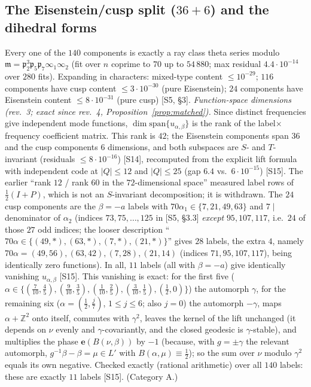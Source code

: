 \documentclass[11pt]{article}
\theoremstyle{definition}
\theoremstyle{plain}
\newcommand{\Z}{\mathbb{Z}}
\newcommand{\e}{\mathbf{e}}
\newcommand{\fp}{\mathfrak{p}}
\newcommand{\fm}{\mathfrak{m}}
\newcommand{\src}[1]{\textup{[S#1]}}
\begin{document}
\subsection{\texorpdfstring{The Eisenstein/cusp split ($36+6$) and the dihedral forms}{The Eisenstein/cusp split (36+6) and the dihedral forms}}
Every one of the $140$ components is exactly a ray class theta series modulo $\fm=\fp_2^3\fp_5\fp_7\infty_1\infty_2$ (fit over $n$ coprime to $70$
up to $54\,880$; max residual $4.4\cdot10^{-14}$ over $280$ fits). Expanding in characters: mixed-type content $\le10^{-29}$; $116$ components have
cusp content $\le3\cdot10^{-30}$ (pure Eisenstein); $24$ components have Eisenstein content $\le8\cdot10^{-31}$ (pure cusp) \src{5, \S3}.
\emph{Function-space dimensions (rev.~3; exact since rev.~4, Proposition~\ref{prop:matched}).} Since distinct frequencies give independent mode functions, $\dim\mathrm{span}\{u_{\alpha,\beta}\}$ is the rank of the
label$\times$frequency coefficient matrix. This rank is $42$; the Eisenstein components span $36$ and the cusp components $6$ dimensions, and both
subspaces are $S$- and $T$-invariant (residuals $\le8\cdot10^{-16}$) \src{14}, recomputed from the explicit lift formula with independent code at
$|Q|\le12$ and $|Q|\le25$ (gap $6.4$ vs.\ $6\cdot10^{-15}$) \src{15}. The earlier ``rank $12$ / rank $60$ in the $72$-dimensional space'' measured label rows of
$\tfrac12(I+P)$, which is not an $S$-invariant decomposition; it is withdrawn.
The $24$ cusp components are the $\beta=-a$ labels with $70\alpha_1\in\{7,21,49,63\}$ and $7\mid$ denominator of $\alpha_2$ (indices $73,75,\dots,125$ in
\src{5, \S3.3} \emph{except} $95,107,117$, i.e.\ $24$ of those $27$ odd indices; the looser description ``$70\alpha\in\{(49,\ast),(63,\ast),(7,\ast),(21,\ast)\}$''
gives $28$ labels, the extra $4$, namely $70\alpha=(49,56),(63,42),(7,28),(21,14)$ (indices $71,95,107,117$), being identically zero functions). In all, $11$ labels (all with $\beta=-a$) give identically vanishing $u_{\alpha,\beta}$
\src{15}. This vanishing is exact: for the first five ($\alpha\in\{(\tfrac7{10},\tfrac45),(\tfrac9{10},\tfrac35),(\tfrac1{10},\tfrac25),(\tfrac3{10},\tfrac15),(\tfrac12,0)\}$) the
automorph $\gamma$, for the remaining six ($\alpha=(\tfrac12,\tfrac j7)$, $1\le j\le6$; also $j=0$) the automorph $-\gamma$, maps $\alpha+\Z^2$ onto itself, commutes
with $\gamma^2$, leaves the kernel of the lift unchanged (it depends on $\nu$ evenly and $\gamma$-covariantly, and the closed geodesic is $\gamma$-stable), and
multiplies the phase $\e(B(\nu,\beta))$ by $-1$ (because, with $g=\pm\gamma$ the relevant automorph, $g^{-1}\beta-\beta=\mu\in L'$ with $B(\alpha,\mu)\equiv\tfrac12$); so the sum over $\nu$ modulo
$\gamma^2$ equals its own negative. Checked exactly (rational arithmetic) over all $140$ labels: these are exactly $11$ labels \src{15}. (Category A.)
\end{document}
